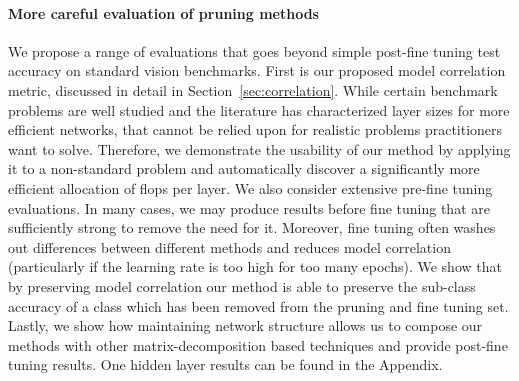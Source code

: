 \paragraph{More careful evaluation of pruning methods}
We propose a range of evaluations that goes beyond simple post-fine tuning test accuracy on standard vision benchmarks.
First is our proposed model correlation metric, discussed in detail in Section~\ref{sec:correlation}.
While certain benchmark problems are well studied and the literature has characterized layer sizes for more efficient networks, that cannot be relied upon for realistic problems practitioners want to solve. Therefore, we demonstrate the usability of our method by applying it to a non-standard problem and automatically discover a significantly more efficient allocation of flops per layer.
We also consider extensive pre-fine tuning evaluations.
In many cases, we may produce results before fine tuning that are sufficiently strong to remove the need for it. Moreover, fine tuning often washes out differences between different methods and reduces model correlation (particularly if the learning rate is too high for too many epochs).
We show that by preserving model correlation our method is able to preserve the sub-class accuracy of a class which has been removed from the pruning and fine tuning set.
Lastly, we show how maintaining  network structure allows us to compose our methods with other matrix-decomposition based techniques and provide post-fine tuning results.  One hidden layer results can be found in the Appendix.



